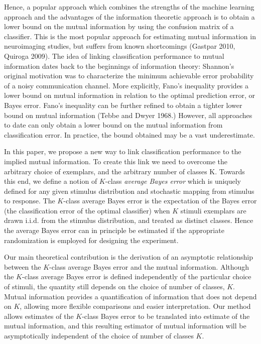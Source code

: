 \documentclass[12pt]{article}
\begin{document}
Hence, a popular approach which combines the strengths of the machine
learning approach and the advantages of the information theoretic
approach is to obtain a lower bound on the mutual information by using
the confusion matrix of a classifier.  This is the most popular
approach for estimating mutual information in neuroimaging studies,
but suffers from known shortcomings (Gastpar 2010, Quiroga 2009).
The idea of linking classification performance to mutual information
dates back to the beginnings of information theory: Shannon's original
motivation was to characterize the minimum achievable error
probability of a noisy communication channel.  More explicitly, Fano's
inequality provides a lower bound on mutual information in relation to
the optimal prediction error, or Bayes error.  Fano's inequality can
be further refined to obtain a tighter lower bound on mutual
information (Tebbe and Dwyer 1968.)  However, all approaches to date
can only obtain a lower bound on the mutual information from
classification error.  In practice, the bound obtained may be a vast
underestimate.

In this paper, we propose a new way to link classification performance
to the implied mutual information. 
To create this link we need to overcome the arbitrary choice of
exemplars, and the arbitrary number of classes K.  Towards this end,
we define a notion of $K$-class \emph{average Bayes error} which is
uniquely defined for any given stimulus distribution and stochastic
mapping from stimulus to response.  The $K$-class average Bayes error
is the expectation of the Bayes error (the classification error
of the optimal classifier) when $K$ stimuli exemplars are drawn
i.i.d. from the stimulus distribution, and treated as distinct
classes.  Hence the average Bayes error can in principle be estimated
if the appropriate randomization is employed for designing the
experiment.

Our main theoretical contribution is the derivation of an asymptotic
relationship between the $K$-class average Bayes error and the mutual
information. Although the $K$-class average Bayes error is defined
independently of the particular choice of stimuli, the quantity still
depends on the choice of number of classes, $K$. Mutual information
provides a quantification of information that does not depend on $K$,
allowing more flexible comparisons and easier interpretation. Our
method allows estimates of the $K$-class Bayes error to be translated
into estimate of the mutual information, and this resulting estimator
of mutual information will be asymptotically independent of the choice
of number of classes $K$.
\end{document}
